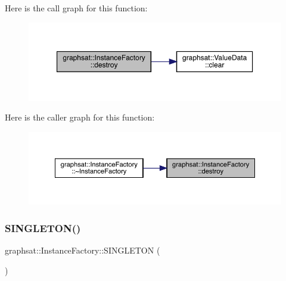 Here is the call graph for this function\+:
\nopagebreak
\begin{figure}[H]
\begin{center}
\leavevmode
\includegraphics[width=350pt]{classgraphsat_1_1_instance_factory_afae2681997d939f16abcbc0fb53866bd_cgraph}
\end{center}
\end{figure}
Here is the caller graph for this function\+:
\nopagebreak
\begin{figure}[H]
\begin{center}
\leavevmode
\includegraphics[width=350pt]{classgraphsat_1_1_instance_factory_afae2681997d939f16abcbc0fb53866bd_icgraph}
\end{center}
\end{figure}
\mbox{\label{classgraphsat_1_1_instance_factory_a821ef74add33f8bc36491344dbeab8ab}} 
\subsubsection{\texorpdfstring{SINGLETON()}{SINGLETON()}}
{\footnotesize\ttfamily graphsat\+::\+Instance\+Factory\+::\+S\+I\+N\+G\+L\+E\+T\+ON (\begin{DoxyParamCaption}\item[{\mbox{\hyperlink{classgraphsat_1_1_instance_factory}{Instance\+Factory}}}]{ }\end{DoxyParamCaption})\hspace{0.3cm}{\ttfamily [private]}}



